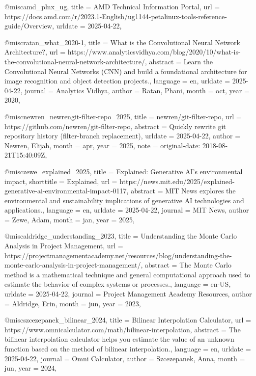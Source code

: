 @misc{amd_plnx_ug,
	title = {{AMD} {Technical} {Information} {Portal}},
	url = {https://docs.amd.com/r/2023.1-English/ug1144-petalinux-tools-reference-guide/Overview},
	urldate = {2025-04-22},
}

@misc{ratan_what_2020-1,
	title = {What is the {Convolutional} {Neural} {Network} {Architecture}?},
	url = {https://www.analyticsvidhya.com/blog/2020/10/what-is-the-convolutional-neural-network-architecture/},
	abstract = {Learn the Convolutional Neural Networks (CNN) and build a foundational architecture for image recognition and object detection projects.},
	language = {en},
	urldate = {2025-04-22},
	journal = {Analytics Vidhya},
	author = {Ratan, Phani},
	month = oct,
	year = {2020},
}

@misc{newren_newrengit-filter-repo_2025,
	title = {newren/git-filter-repo},
	url = {https://github.com/newren/git-filter-repo},
	abstract = {Quickly rewrite git repository history (filter-branch replacement)},
	urldate = {2025-04-22},
	author = {Newren, Elijah},
	month = apr,
	year = {2025},
	note = {original-date: 2018-08-21T15:40:09Z},
}

@misc{zewe_explained_2025,
	title = {Explained: {Generative} {AI}’s environmental impact},
	shorttitle = {Explained},
	url = {https://news.mit.edu/2025/explained-generative-ai-environmental-impact-0117},
	abstract = {MIT News explores the environmental and sustainability implications of generative AI technologies and applications.},
	language = {en},
	urldate = {2025-04-22},
	journal = {MIT News},
	author = {Zewe, Adam},
	month = jan,
	year = {2025},
}

@misc{aldridge_understanding_2023,
	title = {Understanding the {Monte} {Carlo} {Analysis} in {Project} {Management}},
	url = {https://projectmanagementacademy.net/resources/blog/understanding-the-monte-carlo-analysis-in-project-management/},
	abstract = {The Monte Carlo method is a mathematical technique and general computational approach used to estimate the behavior of complex systems or processes.},
	language = {en-US},
	urldate = {2025-04-22},
	journal = {Project Management Academy Resources},
	author = {Aldridge, Erin},
	month = jun,
	year = {2023},
}

@misc{szcezepanek_bilinear_2024,
	title = {Bilinear {Interpolation} {Calculator}},
	url = {https://www.omnicalculator.com/math/bilinear-interpolation},
	abstract = {The bilinear interpolation calculator helps you estimate the value of an unknown function based on the method of bilinear interpolation.},
	language = {en},
	urldate = {2025-04-22},
	journal = {Omni Calculator},
	author = {Szcezepanek, Anna},
	month = jun,
	year = {2024},
}

